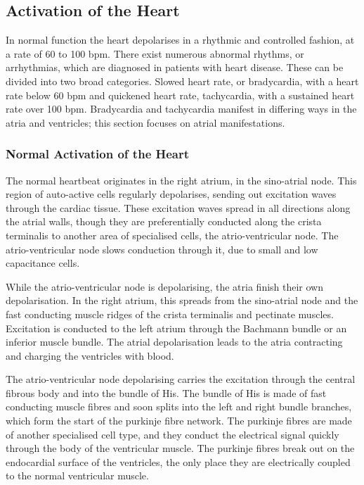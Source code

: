 \subsection{Activation of the Heart}

In normal function the heart depolarises in a rhythmic and controlled fashion,
at a rate of 60 to 100 bpm.
There exist numerous abnormal rhythms, or arrhythmias, which are diagnosed in
patients with heart disease.
These can be divided into two broad categories.
Slowed heart rate, or bradycardia, with a heart rate below 60 bpm and quickened
heart rate, tachycardia, with a sustained heart rate over 100 bpm.
Bradycardia and tachycardia manifest in differing ways in the atria and
ventricles; this section focuses on atrial manifestations.

\subsubsection{Normal Activation of the Heart}

The normal heartbeat originates in the right atrium, in the sino-atrial node.
This region of auto-active cells regularly depolarises, sending out excitation
waves through the cardiac tissue.
These excitation waves spread in all directions along the atrial walls, though
they are preferentially conducted along the crista terminalis to another area of
specialised cells, the atrio-ventricular node.
The atrio-ventricular node slows conduction through it, due to small and low
capacitance cells.

While the atrio-ventricular node is depolarising, the atria finish their own
depolarisation.
In the right atrium, this spreads from the sino-atrial node and the fast
conducting muscle ridges of the crista terminalis and pectinate muscles.
Excitation is conducted to the left atrium through the Bachmann bundle or
an inferior muscle bundle.
The atrial depolarisation leads to the atria contracting and charging the
ventricles with blood.

The atrio-ventricular node depolarising carries the excitation through the
central fibrous body and into the bundle of His.
The bundle of His is made of fast conducting muscle fibres and soon splits into
the left and right bundle branches, which form the start of the purkinje fibre
network.
The purkinje fibres are made of another specialised cell type, and they conduct
the electrical signal quickly through the body of the ventricular muscle.
The purkinje fibres break out on the endocardial surface of the ventricles, the
only place they are electrically coupled to the normal ventricular muscle.

